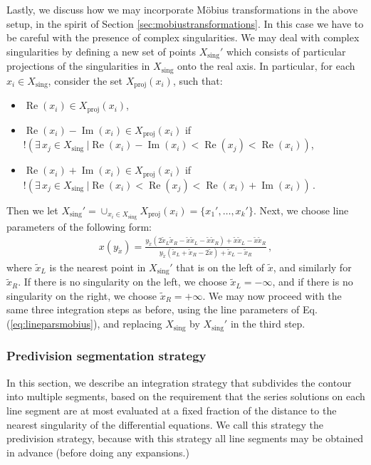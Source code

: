\documentclass{article}
\begin{document}
Lastly, we discuss how we may incorporate Möbius transformations in the above setup, in the spirit of Section \ref{sec:mobiustransformations}. In this case we have to be careful with the presence of complex singularities. We may deal with complex singularities by defining a new set of points $X_{\text{sing}}'$ which consists of particular projections of the singularities in $X_{\text{sing}}$ onto the real axis. In particular, for each $x_i \in X_{\text{sing}}$, consider the set $X_{\text{proj}}(x_i)$, such that:
\begin{itemize}
    \item $\operatorname{Re}\left(x_{i}\right) \in X_{\text{proj}}\left(x_{i}\right)$,
    \item $\operatorname{Re}\left(x_{i}\right)-\operatorname{Im}\left(x_{i}\right) \in X_{\text{proj}}\left(x_{i}\right)$ if $!\left( \exists \,x_{j} \in X_{\text {sing }} | \operatorname{Re}\left(x_{i}\right)-\operatorname{Im}\left(x_{i}\right)<\operatorname{Re}\left(x_{j}\right)<\operatorname{Re}\left(x_{i}\right)\right)$,
    \item $\operatorname{Re}\left(x_{i}\right)+\operatorname{Im}\left(x_{i}\right) \in X_{\text{proj}}\left(x_{i}\right)$ if $! \left( \exists\,x_{j} \in X_{\text {sing }} | \operatorname{Re}\left(x_{i}\right)<\operatorname{Re}\left(x_{j}\right)<\operatorname{Re}\left(x_{i}\right)+\operatorname{Im}\left(x_{i}\right)\right)$\,.
\end{itemize}
Then we let $X_{\text{sing}}' = \cup_{x_i \in X_{\text{sing}}} X_\text{proj}(x_i) = \{x_1', \ldots, x_{k}'\}$. Next, we choose line parameters of the following form:
\begin{align}
    \label{eq:lineparsmobius}
    x(y_{\tilde{x}}) = \frac{y_{\tilde{x}}\left(2 \tilde{x}_{L} \tilde{x}_{R}-\tilde{x} \tilde{x}_{L}-\tilde{x} \tilde{x}_{R}\right)+\tilde{x} \tilde{x}_{L}-\tilde{x} \tilde{x}_{R}}{y_{\tilde{x}}\left(\tilde{x}_{L}+\tilde{x}_{R}-2 \tilde{x}\right)+\tilde{x}_{L}-\tilde{x}_{R}}\,,
\end{align}
where $\tilde{x}_L$ is the nearest point in $X_\text{sing}'$ that is on the left of $\tilde{x}$, and similarly for $\tilde{x}_R$. If there is no singularity on the left, we choose $\tilde{x}_L = -\infty$, and if there is no singularity on the right, we choose $\tilde{x}_R = +\infty$. We may now proceed with the same three integration steps as before, using the line parameters of Eq. (\ref{eq:lineparsmobius}), and replacing $X_\text{sing}$ by $X_{\text{sing}}'$ in the third step.

\subsubsection{Predivision segmentation strategy}
\label{sec:predivision}
In this section, we describe an integration strategy that subdivides the contour into multiple segments, based on the requirement that the series solutions on each line segment are at most evaluated at a fixed fraction of the distance to the nearest singularity of the differential equations. We call this strategy the predivision strategy, because with this strategy all line segments may be obtained in advance (before doing any expansions.) 
\end{document}
